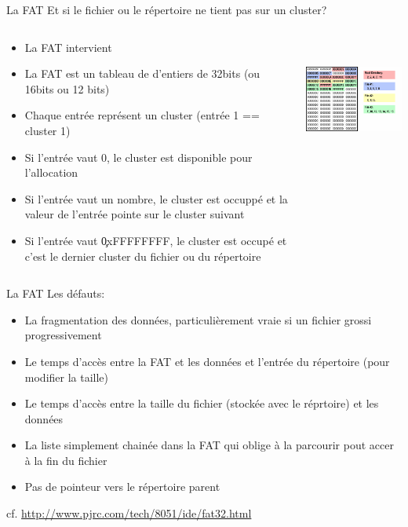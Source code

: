 \begin{frame}[fragile=singleslide]{La FAT}
  Et si le fichier ou le répertoire ne tient pas sur un cluster?
  \begin{columns}
    \begin{column}{7cm}
      \begin{itemize}
      \item La FAT intervient
      \item La FAT est un tableau  de d'entiers de 32bits (ou 16bits ou 12
        bits)
      \item Chaque entrée représent un cluster (entrée 1 == cluster 1)
      \item  Si   l'entrée  vaut  0,   le  cluster  est   disponible  pour
        l'allocation
      \item  Si l'entrée  vaut un  nombre, le  cluster est  occuppé  et la
        valeur de l'entrée pointe sur le cluster suivant
      \item  Si l'entrée  vaut \c{0xFFFFFFFF},  le cluster  est  occupé et
        c'est le dernier cluster du fichier ou du répertoire
      \end{itemize}
    \end{column}
    \begin{column}{5cm}
      \includegraphics[height=4cm]{pics/fat_sector}
    \end{column}
  \end{columns}
\end{frame}

\begin{frame}[fragile=singleslide]{La FAT}
  Les défauts:
  \begin{itemize}
  \item  La fragmentation  des données,  particulièrement vraie  si un
    fichier grossi progressivement
  \item Le  temps d'accès entre la  FAT et les données  et l'entrée du
    répertoire (pour modifier la taille)
  \item Le temps  d'accès entre la taille du  fichier (stockée avec le
    réprtoire) et les données
  \item  La liste  simplement  chainée dans  la  FAT qui  oblige à  la
    parcourir pout accer à la fin du fichier
  \item Pas de pointeur vers le répertoire parent
  \end{itemize}
  cf. \url{http://www.pjrc.com/tech/8051/ide/fat32.html}
\end{frame}

